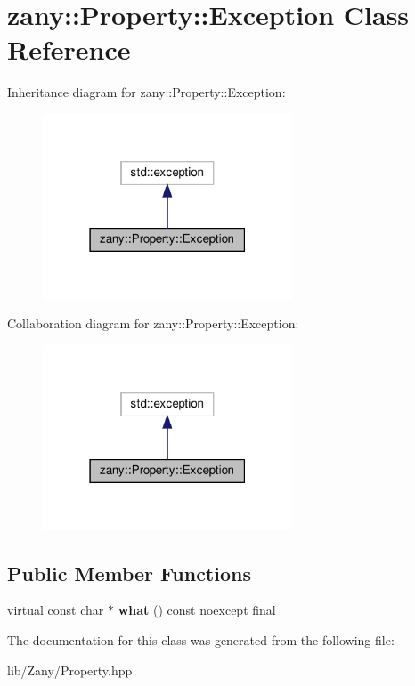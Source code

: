 \hypertarget{classzany_1_1_property_1_1_exception}{}\section{zany\+:\+:Property\+:\+:Exception Class Reference}
\label{classzany_1_1_property_1_1_exception}


Inheritance diagram for zany\+:\+:Property\+:\+:Exception\+:
\nopagebreak
\begin{figure}[H]
\begin{center}
\leavevmode
\includegraphics[width=210pt]{classzany_1_1_property_1_1_exception__inherit__graph}
\end{center}
\end{figure}


Collaboration diagram for zany\+:\+:Property\+:\+:Exception\+:
\nopagebreak
\begin{figure}[H]
\begin{center}
\leavevmode
\includegraphics[width=210pt]{classzany_1_1_property_1_1_exception__coll__graph}
\end{center}
\end{figure}
\subsection*{Public Member Functions}
\begin{DoxyCompactItemize}
\item 
\mbox{\label{classzany_1_1_property_1_1_exception_a003cf2f8f5cd51c1432956b49a9f9244}} 
virtual const char $\ast$ {\bfseries what} () const noexcept final
\end{DoxyCompactItemize}


The documentation for this class was generated from the following file\+:\begin{DoxyCompactItemize}
\item 
lib/\+Zany/Property.\+hpp\end{DoxyCompactItemize}

